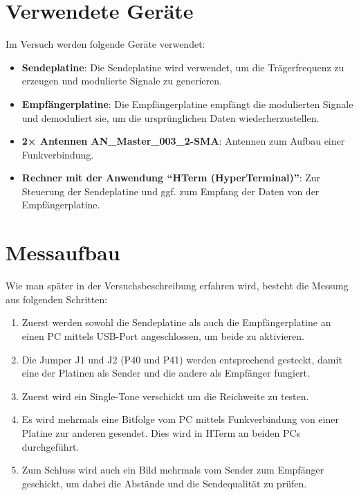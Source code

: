 \section{Verwendete Geräte}
Im Versuch werden folgende Geräte verwendet:
\begin{itemize}
    \item \textbf{Sendeplatine}: Die Sendeplatine wird verwendet, um die Trägerfrequenz zu erzeugen und modulierte Signale zu generieren.
    \item \textbf{Empfängerplatine}: Die Empfängerplatine empfängt die modulierten Signale und demoduliert sie, um die ursprünglichen Daten wiederherzustellen.
    \item \textbf{2× Antennen AN\_Master\_003\_2-SMA}: Antennen zum Aufbau einer Funkverbindung.
    \item \textbf{Rechner mit der Anwendung "`HTerm (HyperTerminal)"'}: Zur Steuerung der Sendeplatine und ggf. zum Empfang der Daten von der Empfängerplatine.
\end{itemize}
\section{Messaufbau}
Wie man später in der Versuchsbeschreibung erfahren wird, besteht die Messung aus folgenden Schritten:
\begin{enumerate}
    \item Zuerst werden sowohl die Sendeplatine als auch die Empfängerplatine an einen PC mittels USB-Port angeschlossen, um beide zu aktivieren.
    \item Die Jumper J1 und J2 (P40 und P41) werden entsprechend gesteckt, damit eine der Platinen als Sender und die andere als Empfänger fungiert.
    \item Zuerst wird ein Single-Tone verschickt um die Reichweite zu testen.
    \item Es wird mehrmals eine Bitfolge vom PC mittels Funkverbindung von einer Platine zur anderen gesendet. Dies wird in HTerm an beiden PCs durchgeführt.
    \item Zum Schluss wird auch ein Bild mehrmals vom Sender zum Empfänger geschickt, um dabei die Abstände und die Sendequalität zu prüfen.
\end{enumerate}
\clearpage